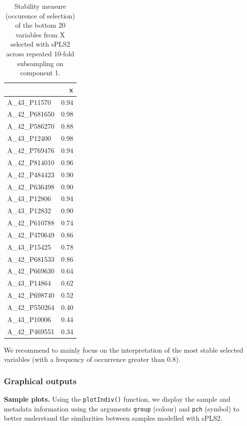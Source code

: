 \documentclass[
]{book}
\begin{document}
\begin{longtable}[t]{l|r}
\caption{\label{tab:04-spls2-stab-table}Stability measure (occurence of selection) of the bottom 20 variables from X selected with sPLS2 across repeated 10-fold subsampling on component 1.}\\
\hline
  & x\\
\hline
A\_43\_P11570 & 0.94\\
\hline
A\_42\_P681650 & 0.98\\
\hline
A\_42\_P586270 & 0.88\\
\hline
A\_43\_P12400 & 0.98\\
\hline
A\_42\_P769476 & 0.94\\
\hline
A\_42\_P814010 & 0.96\\
\hline
A\_42\_P484423 & 0.90\\
\hline
A\_42\_P636498 & 0.90\\
\hline
A\_43\_P12806 & 0.94\\
\hline
A\_43\_P12832 & 0.90\\
\hline
A\_42\_P610788 & 0.74\\
\hline
A\_42\_P470649 & 0.86\\
\hline
A\_43\_P15425 & 0.78\\
\hline
A\_42\_P681533 & 0.86\\
\hline
A\_42\_P669630 & 0.64\\
\hline
A\_43\_P14864 & 0.62\\
\hline
A\_42\_P698740 & 0.52\\
\hline
A\_42\_P550264 & 0.40\\
\hline
A\_43\_P10006 & 0.44\\
\hline
A\_42\_P469551 & 0.34\\
\hline
\end{longtable}

We recommend to mainly focus on the interpretation of the most stable selected variables (with a frequency of occurrence greater than 0.8).

\hypertarget{04:spls2-plots}{%
\subsubsection{Graphical outputs}\label{04:spls2-plots}}

\textbf{Sample plots.}
Using the \texttt{plotIndiv()} function, we display the sample and metadata information using the arguments \texttt{group} (colour) and \texttt{pch} (symbol) to better understand the similarities between samples modelled with sPLS2.
\end{document}
